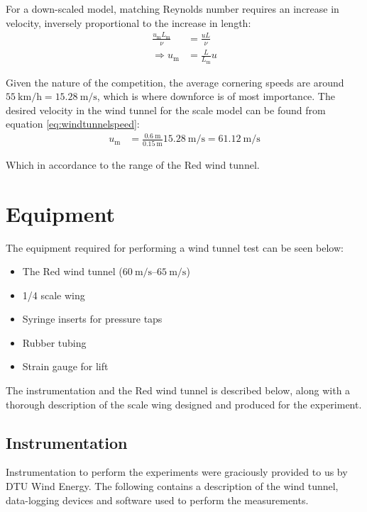     For a down-scaled model, matching Reynolds number requires an increase in velocity, inversely proportional to the increase in length:
    \begin{align}
      \frac{u_\text{m} L_\text{m}}{\nu} &= \frac{u L}{\nu} \nonumber \\
      \Rightarrow u_\text{m} &= \frac{L}{L_\text{m}} u \label{eq:windtunnelspeed}
    \end{align}

    Given the nature of the competition, the average cornering speeds are around $\SI{55}{\kilo \meter \per \hour} = \SI{15.28}{\metre\per\second}$, which is where downforce is of most importance. The desired velocity in the wind tunnel for the scale model can be found from equation \ref{eq:windtunnelspeed}:
    \begin{align*}
      u_\text{m} &= \frac{\SI{0.6}{\metre}}{\SI{0.15}{\metre}} \SI{15.28}{\metre\per\second} = \SI{61.12}{\metre\per\second}
    \end{align*}

    Which in accordance to the range of the Red wind tunnel.

\section{Equipment}

  The equipment required for performing a wind tunnel test can be seen below:
  \begin{itemize}
    \item The Red wind tunnel ($\SIrange{60}{65}{\metre\per\second}$)
    \item 1/4 scale wing
    \item Syringe inserts for pressure taps
    \item Rubber tubing
    \item Strain gauge for lift
  \end{itemize}

  The instrumentation and the Red wind tunnel is described below, along with a thorough description of the scale wing designed and produced for the experiment.

  \subsection{Instrumentation}

    Instrumentation to perform the experiments were graciously provided to us by DTU Wind Energy. The following contains a description of the wind tunnel, data-logging devices and software used to perform the measurements.

